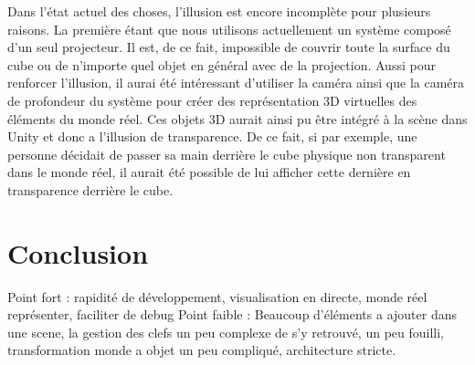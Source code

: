 Dans l'état actuel des choses, l'illusion est encore incomplète pour plusieurs raisons. La première étant que nous utilisons actuellement un système composé d'un seul projecteur. Il est, de ce fait, impossible de couvrir toute la surface du cube ou de n'importe quel objet en général avec de la projection. Aussi pour renforcer l'illusion, il aurai été intéressant d'utiliser la caméra ainsi que la caméra de profondeur du système pour créer des représentation 3D virtuelles des éléments du monde réel. Ces objets 3D aurait ainsi pu être intégré à la scène dans Unity et donc a l'illusion de transparence. De ce fait, si par exemple, une personne décidait de passer sa main derrière le cube physique non transparent dans le monde réel, il aurait été possible de lui afficher cette dernière en transparence derrière le cube.

\section{Conclusion}
Point fort : rapidité de développement, visualisation en directe, monde réel représenter, faciliter de debug
Point faible : Beaucoup d'éléments a ajouter dans une scene, la gestion des clefs un peu complexe de s'y retrouvé, un peu fouilli, transformation monde a objet un peu compliqué, architecture stricte.
